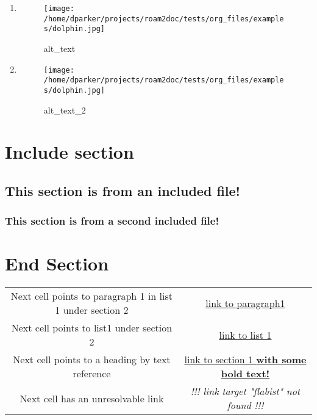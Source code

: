 \documentclass[11pt]{article}
\begin{document}
\begin{enumerate} \label{obj-363}
\item
\begin{figure} [ht]
\centering
\texttt{[image: /home/dparker/projects/roam2doc/tests/org\_files/examples/dolphin.jpg]}
\caption{alt\_text}
\end{figure}
\item
\begin{figure} [ht]
\centering
\texttt{[image: /home/dparker/projects/roam2doc/tests/org\_files/examples/dolphin.jpg]}
\caption{alt\_text\_2}
\end{figure}
\vspace{\baselineskip}
\end{enumerate}
\section{Include section  }
 \label{obj-370}
 \label{obj-369}
\subsection{This section is from an included file!  }
 \label{obj-373}
 \label{obj-372}
\vspace{\baselineskip}
\subsubsection{This section is from a second included file!  }
 \label{obj-377}
 \label{obj-376}
\vspace{\baselineskip}
\section{End Section  }
 \label{obj-381}
 \label{obj-380}
\label{obj-384} 

 \label{obj-385}
\begin{tabular}{|c|c|}
\hline
 Next cell points to paragraph 1 in list 1 under section 2  & \hyperref[obj-50]{link to paragraph1} \\
 Next cell points to list1 under section 2                  & \hyperref[obj-75]{link to list 1} \\
 Next cell points to a heading by text reference            & \hyperref[obj-15]{link to section 1 \textbf{with some bold text!}} \\
 Next cell has an unresolvable link                         & \textit{!!! link target "flabist" not found !!!} \\
\hline
\end{tabular}
\vspace{\baselineskip}
\vspace{\baselineskip}
\printindex
\end{document}
